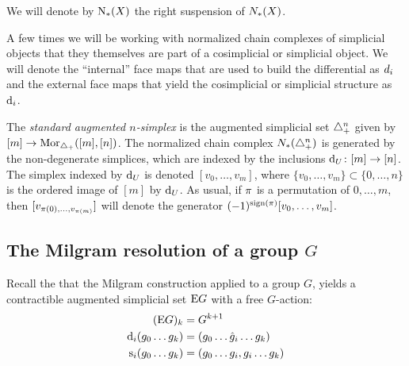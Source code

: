 \begin{notation}\label{notation:chains}
	We will denote by $\operatorname{N}_{*}(X)$ the right suspension of $N_{*}(X)$.
\end{notation}

\begin{notation}
	A few times we will be working with normalized chain complexes of simplicial objects that they themselves are part of a cosimplicial or simplicial object. We will denote the ``internal'' face maps that are used to build the differential as $d_i$ and the external face maps that yield the cosimplicial or simplicial structure as $\operatorname{d}_i$.
\end{notation}

The \emph{standard augmented $n$-simplex} is the augmented simplicial set $\triangle^n_+$ given by $[m] \to \mathrm{Mor}_{\triangle_{+}}([m],[n])$. The normalized chain complex $N_{*}(\triangle_{+}^n)$ is generated by the non-degenerate simplices, which are indexed by the inclusions $\operatorname{d}_U \colon [m] \to [n]$. The simplex indexed by $\operatorname{d}_U$ is denoted $[v_0,\dots,v_{m}]$, where $\{v_0,\dots,v_{m}\} \subset \{0,\dots,n\}$ is the ordered image of $[m]$ by $\operatorname{d}_U$. As usual, if $\pi$ is a permutation of $0,\dots,m$, then $[v_{\pi(0),\dots,v_{\pi(m)}}]$ will denote the generator $(-1)^{\operatorname{sign}(\pi)}[v_0,\dots,v_m]$.


\subsection{The Milgram resolution of a group \texorpdfstring{$G$}{G}}

Recall the that the Milgram construction applied to a group $G$, yields a contractible augmented simplicial set $\mathrm{E}G$ with a free $G$-action:
\begin{align*}
	(\mathrm{E}G)_k &= G^{k+1}\\
	\operatorname{d}_i(g_0\dots g_k) &= (g_0\dots\hat{g}_i\dots g_k) \\
	\operatorname{s}_i(g_0\dots g_k) &= (g_0\dots g_i,g_i\dots g_k)
\end{align*}
